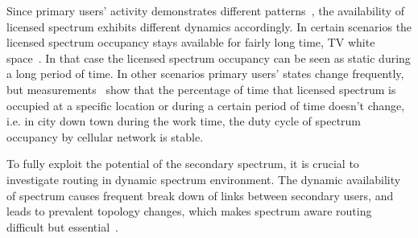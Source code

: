 Since primary users' activity demonstrates different patterns~\cite{commag-Khalife08}, the availability of licensed spectrum exhibits different dynamics accordingly.
In certain scenarios the licensed spectrum occupancy stays available for fairly long time, \eg TV white space~\cite{SenseLess2011}.
In that case the licensed spectrum occupancy can be seen as static during a long period of time.
In other scenarios primary users' states change frequently, but measurements~\cite{Wellens200910, measurement_Palaios14} show that the percentage of time that licensed spectrum is occupied at a specific location or during a certain period of time doesn’t change, i.e. in city down town during the work time, the duty cycle of spectrum occupancy by cellular network is stable.

To fully exploit the potential of the secondary spectrum, it is crucial to investigate routing in dynamic spectrum environment.
The dynamic availability of spectrum causes frequent break down of links between secondary users, and leads to prevalent topology changes, which makes spectrum aware routing difficult but essential~\cite{routing_CRN_challenges_solutions_2011}.

